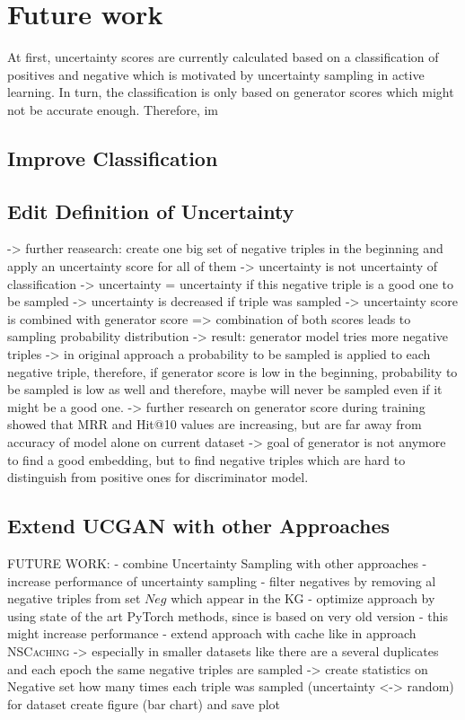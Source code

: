 \section{Future work} 
\label{sec:futurework}

At first, uncertainty scores are currently calculated based on a classification of positives and negative which is motivated by uncertainty sampling in active learning.
In turn, the classification is only based on generator scores which might not be accurate enough.
Therefore, im




\subsection{Improve Classification}



\subsection{Edit Definition of Uncertainty}

-> further reasearch: create one big set of negative triples in the beginning and apply an uncertainty score \in [0,1] for all of them
-> uncertainty is not uncertainty of classification
-> uncertainty = uncertainty if this negative triple is a good one to be sampled
-> uncertainty is decreased if triple was sampled
-> uncertainty score is combined with generator score
=> combination of both scores leads to sampling probability distribution
-> result: generator model tries more negative triples
-> in original approach a probability to be sampled is applied to each negative triple, therefore, if generator score is low in the beginning, probability to be sampled is low as well and therefore, maybe will never be sampled even if it might be a good one.
-> further research on generator score during training showed that MRR and Hit@10 values are increasing, but are far away from accuracy of model alone on current dataset
-> goal of generator is not anymore to find a good embedding, but to find negative triples which are hard to distinguish from positive ones for discriminator model.


\subsection{Extend UCGAN with other Approaches}

FUTURE WORK:
- combine Uncertainty Sampling with other approaches
- increase performance of uncertainty sampling
- filter negatives by removing al negative triples from set $Neg$ which appear in the KG
- optimize approach by using state of the art PyTorch methods, since \kbgan is based on very old version
- this might increase performance
- extend approach with cache like in approach \textsc{NSCaching} 
-> especially in smaller datasets like \umls  there are a several duplicates and each epoch the same negative triples are sampled
-> create statistics on Negative set how many times each triple was sampled (uncertainty <-> random) for \umls dataset
create figure (bar chart) and save plot






